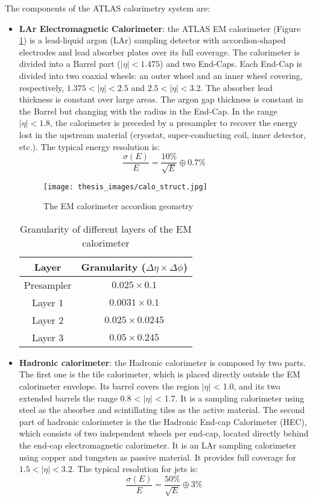 \documentclass[a4paper, oneside, 11pt, openright]{book}
\begin{document}
				
				The components of the ATLAS calorimetry system are:
				\begin{itemize}
					\item \textbf{LAr Electromagnetic Calorimeter}: the ATLAS EM calorimeter \cite{LArCalo_report} (Figure \ref{fig:calo struct}) is a lead-liquid argon (LAr) sampling detector with accordion-shaped electrodes and lead absorber plates over its full coverage. The calorimeter is divided into a Barrel part ($|\eta|<1.475$) and two End-Caps. Each End-Cap is divided into two coaxial wheels: an outer wheel and an inner wheel covering, respectively, $1.375<|\eta|<2.5$ and $2.5<|\eta|<3.2$. The absorber lead thickness is constant over large areas. The argon gap thickness is constant in the Barrel but changing with the radius in the End-Cap. In the range $|\eta|<1.8$, the calorimeter is preceded by a presampler to recover the energy lost in the upstream material (cryostat, super-conducting coil, inner detector, etc.). The typical energy resolution is:
					$$ 
					\frac{\sigma(E)}{E} = \frac{10\%}{\sqrt{E}} \oplus 0.7\%
					$$
					
					\begin{figure}[h!]
						\centering
						\texttt{[image: thesis\_images/calo\_struct.jpg]}
						\caption{The EM calorimeter accordion geometry}
						\label{fig:calo struct}
					\end{figure}
					\begin{table}[h!]
						\centering
						\begin{tabular}{cc}
							\toprule[1.5pt]
							\textbf{Layer} & \textbf{Granularity ($\Delta\eta \times \Delta\phi$)} \\
							\midrule
							Presampler & $0.025 \times 0.1$ \\
							Layer 1 & $0.0031 \times 0.1$ \\
							Layer 2 & $0.025 \times 0.0245$ \\
							Layer 3 & $0.05 \times 0.245$ \\
							\bottomrule[1.5pt]
						\end{tabular}
						\caption{Granularity of different layers of the EM calorimeter}\label{tab:granularity}
						
					\end{table}

					\item \textbf{Hadronic calorimeter}: the Hadronic calorimeter \cite{LArCalo_report} is composed by two parts. The first one is the tile calorimeter, which is placed directly outside the EM calorimeter envelope. Its barrel covers the region $|\eta|$ < 1.0, and its two extended barrels the range 0.8 < $|\eta|$ < 1.7. It is a sampling calorimeter using steel as the absorber and scintillating tiles as the active material. The second part of hadronic calorimeter is the the Hadronic End-cap Calorimeter (HEC), which consists of two independent wheels per end-cap, located directly behind the end-cap electromagnetic calorimeter. It is an LAr sampling calorimeter using copper and tungsten as passive material. It provides full coverage for $1.5<|\eta|<3.2$. The typical resolution for jets is:
					$$ 
					\frac{\sigma(E)}{E} = \frac{50\%}{\sqrt{E}} \oplus 3\%
					$$
					

\end{itemize}
\end{document}

